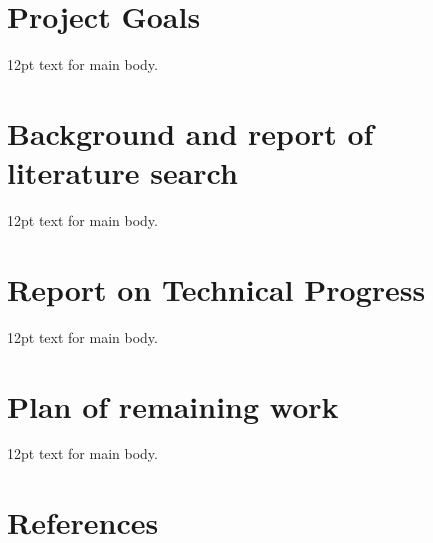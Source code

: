 \documentclass[12pt,a4paper]{article}
\begin{document}
\tableofcontents
\pagebreak

\setcounter{secnumdepth}{1}
\section{Project Goals}
12pt text for main body.
\pagebreak

\section{Background and report of literature search}
12pt text for main body.
\pagebreak

\section{Report on Technical Progress}
12pt text for main body.
\pagebreak

\section{Plan of remaining work}
12pt text for main body.
\pagebreak

\setcounter{secnumdepth}{0}
\section{References}
\end{document}
